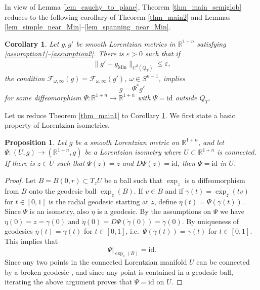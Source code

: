 \documentclass[11pt,letterpaper]{amsart}
\newtheorem{Corollary}[Theorem]{Corollary}
\newtheorem{Proposition}[Theorem]{Proposition}
\theoremstyle{definition}
\numberwithin{equation}{section}
\newcommand{\mR}{\mathbb{R}}                    %
\newcommand{\norm}[1]{\lVert #1 \rVert}         %
\newcommand{\ol}[1]{\overline{#1}}
\newcommand{\id}{\mathrm{id}}
\newcommand{\eps}{\varepsilon}
\newcommand{\gm}{g_{\mathrm{Min}}}
\begin{document}
In view of Lemma \ref{lem_cauchy_to_plane}, Theorem \ref{thm_main_semiglob} reduces to the following corollary of Theorem \ref{thm_main2} and Lemmas \ref{lem_simple_near_Min}--\ref{lem_spanning_near_Min}.

\begin{Corollary}\label{cor_main}
Let $g, g'$ be smooth Lorentzian metrics  in $\mR^{1+n}$ satisfying \eqref{assumption1}--\eqref{assumption2}. There is $\eps > 0$ such that if
\begin{gather*}
\norm{g'-\gm}_{C^2(\ol{Q}_T)} \leq \eps,
\end{gather*}
the condition
$\mathcal F_{\omega, \infty}(g) = \mathcal F_{\omega, \infty}(g')$,  $\omega \in S^{n-1}$, implies 
\[
g = \Psi^* g'
\]
for some diffeomorphism $\Psi: \mR^{1+n} \to \mR^{1+n}$ with $\Psi = \id$ outside $Q_T$.
\end{Corollary}

Let us reduce Theorem \ref{thm_main1} to Corollary \ref{cor_main}. We first state a basic property of Lorentzian isometries.

\begin{Proposition} \label{prop_conformal_identity}
Let $g$ be a smooth Lorentzian metric on $\mR^{1+n}$, and let $\Psi: (U,g) \to (\mR^{1+n},g)$ be a Lorentzian isometry where $U \subset \mR^{1+n}$ is connected. If there is $z \in U$ such that $\Psi(z) = z$ and $D\Psi(z) = \id$, then $\Psi = \id$ in $U$.
\end{Proposition}
\begin{proof}
Let $B = B(0,r) \subset T_z U$ be a ball such that $\exp_z$ is a diffeomorphism from $B$ onto the geodesic ball $\exp_z(B)$. If $v \in B$ and if $\gamma(t) = \exp_z(tv)$ for $t \in [0,1]$ is the radial geodesic starting at $z$, define $\eta(t) = \Psi(\gamma(t))$. Since $\Psi$ is an isometry, also $\eta$ is a geodesic. By the assumptions on $\Psi$ we have $\eta(0) = z = \gamma(0)$ and $\dot{\eta}(0) = D\Psi(\dot{\gamma}(0)) = \dot{\gamma}(0)$. By uniqueness of geodesics $\eta(t) = \gamma(t)$ for $t \in [0,1]$, i.e.\ $\Psi(\gamma(t)) = \gamma(t)$ for $t \in [0,1]$. This implies that 
\[
\Psi|_{\exp_z(B)} = \id.
\]
Since any two points in the connected Lorentzian manifold $U$ can be connected by a broken geodesic \cite{oneill1983}, and since any point is contained in a geodesic ball, iterating the above argument proves that $\Psi = \id$ on $U$.
\end{proof}
\end{document}
